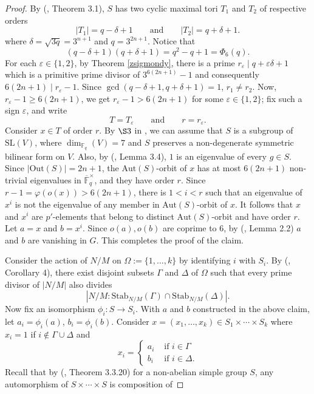 \documentclass[11pt, a4paper]{article}
\numberwithin{equation}{section}
\theoremstyle{plain} %
\begin{document}
\begin{proof}
By (\cite{MR2507573}, Theorem 3.1), $S$ has two cyclic maximal tori
$T_{1}$ and $T_{2}$ of respective orders
$$
|T_{1}|=q-\delta+1
\qquad\text{and}\qquad
|T_{2}|=q+\delta+1.
$$ where $\delta=\sqrt{3q}=3^{n+1}$ and $q=3^{2n+1}$.
Notice that
$$
(q-\delta+1)(q+\delta+1)
=
q^2-q+1
=
\Phi_6(q).
$$
 For each
$\varepsilon\in\{1,2\}$, by Theorem \ref{zsigmondy}, there is a prime
$r_{\varepsilon}\mid q+\varepsilon\delta+1$
which is a primitive prime divisor of
$3^{6(2n+1)}-1$ and consequently
$6(2n+1)\mid r_{\varepsilon}-1.$ Since $\gcd(q-\delta+1,q+\delta+1)=1$, $r_{1}\neq r_{2}$. Now, $r_{\varepsilon}-1 \ge 6(2n+1)$, we get $r_{\varepsilon}-1>6(2n+1)$ for some $\varepsilon\in\{1,2\}$; fix such a sign $\varepsilon$, and write
$$
T=T_{\varepsilon}
\qquad\text{and}\qquad
r=r_{\varepsilon}.
$$
Consider $x\in T$ of order $r$. By $\S 3$ in \cite{MR3232797} , we can assume that $S$ is a subgroup of $\mathrm{SL}(V)$, where $\dim_{\mathbb{F}_q}(V)=7$ and $S$ preserves a non-degenerate symmetric bilinear form on $V$. Also, by (\cite{MR3232797}, Lemma 3.4), $1$ is an eigenvalue of every $g\in S$. Since $|\mathrm{Out}(S)|=2n+1$, the $\mathrm{Aut}(S)$-orbit of $x$ has at most $6(2n+1)$ non-trivial eigenvalues in $\overline{\mathbb{F}}_q^{\times}$, and they have order $r$. Since $r-1=\varphi(o(x))>6(2n+1)$, there is $1<i<r$ such that  an eigenvalue of $x^i$ is not the eigenvalue of any member in $\mathrm{Aut}(S)$-orbit of $x$. It follows that $x$ and $x^i$ are $p'$-elements that belong to distinct $\mathrm{Aut}(S)$-orbit and have order $r$. Let $a=x$ and $b=x^i$. Since $o(a),o(b)$ are coprime to $6$, by (\cite{MR3500775}, Lemma 2.2) $a$ and $b$ are vanishing in $G$. This completes the proof of the claim. 



\vskip5mm
Consider the action of $N/M$ on $\Omega:=\{1,\ldots, k\}$ by identifying $i$ with $S_i$. By (\cite{MR1785438}, Corollary 4), there exist  disjoint subsets $\Gamma$ and $\Delta$ of $\Omega$ such that every prime divisor of $|N/M|$ also divides 
$$
|N/M : \mathrm{Stab}_{N/M}(\Gamma)\cap \mathrm{Stab}_{N/M}(\Delta)|.
$$
Now fix an isomorphism $\phi_i: S\rightarrow S_i$. With $a$ and $b$ constructed in the above claim, let $a_i=\phi_i(a)$, $b_i=\phi_i(b)$. Consider $x=(x_1,\ldots, x_k)\in S_1\times \cdots \times S_k$ where  $x_i=1$ if $i\notin \Gamma\cup\Delta$ and 
$$
x_i=
\begin{cases} 
a_i & \mbox{ if } i\in \Gamma \\
b_i & \mbox { if } i\in \Delta.\end{cases}
$$ 
Recall that by (\cite{MR1357169}, Theorem 3.3.20) for a non-abelian simple group $S$, any automorphism of $S\times \cdots \times S$ is composition of 


\end{proof}
\end{document}
